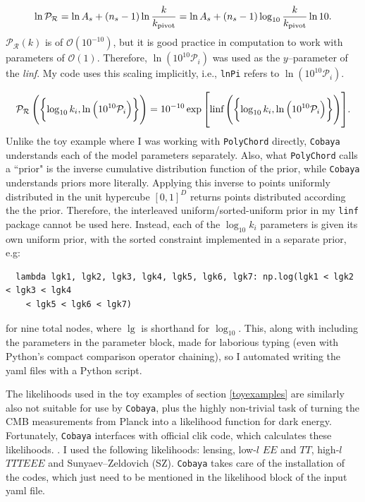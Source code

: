 \documentclass{article}
\begin{document}
\begin{equation}
  \ln{\mathcal P_\mathcal R} = \ln{A_s} + \left(n_s - 1\right) \ln{\frac{k}{k_\textrm{pivot}}} = \ln{A_s} + \left(n_s - 1\right) \log_{10}{\frac{k}{k_\textrm{pivot}}} \ln{10}\textrm.
\end{equation}
%
$\mathcal P_\mathcal R(k)$ is of $\mathcal{O}\left(10^{-10}\right)$, but it is good practice in computation to work with parameters of $\mathcal{O}\left(1\right)$. Therefore, $\ln{\left(10^{10}\mathcal P_i\right)}$  was used as the $y$--parameter of the \textit{linf}. My code uses this scaling implicitly, i.e., \texttt{lnPi} refers to $\ln{\left(10^{10}\mathcal P_i\right)}$.

\begin{equation}
  \mathcal P_\mathcal R\left(\left\{\log_{10}{k_i}, \ln{\left(10^{10}\mathcal P_i\right)}\right\}\right) = 10^{-10} \exp{\left[{\textrm{linf}\left(\left\{\log_{10}{k_i}, \ln{\left(10^{10}\mathcal P_i\right)}\right\}\right)}\right]}\textrm.
\end{equation}
%
Unlike the toy example where I was working with \texttt{PolyChord} directly, \texttt{Cobaya} understands each of the model parameters separately. Also, what \texttt{PolyChord} calls a ``prior" is the inverse cumulative distribution function of the prior, while \texttt{Cobaya} understands priors more literally. Applying this inverse to points uniformly distributed in the unit hypercube $[0, 1]^D$ returns points distributed according the the prior. Therefore, the interleaved uniform/sorted-uniform prior in my \texttt{linf} package cannot be used here. Instead, each of the $\log_{10}{k_i}$ parameters is given its own uniform prior, with the sorted constraint implemented in a separate prior, e.g:
\begin{verbatim}
  lambda lgk1, lgk2, lgk3, lgk4, lgk5, lgk6, lgk7: np.log(lgk1 < lgk2 < lgk3 < lgk4 
    < lgk5 < lgk6 < lgk7)
\end{verbatim}
for nine total nodes, where $\lg$ is shorthand for $\log_{10}$. This, along with including the parameters in the parameter block, made for laborious typing (even with Python's compact comparison operator chaining), so I automated writing the yaml files with a Python script.

The likelihoods used in the toy examples of section \ref{toyexamples} are similarly also not suitable for use by \texttt{Cobaya}, plus the highly non-trivial task of turning the CMB measurements from Planck into a likelihood function for dark energy. Fortunately, \texttt{Cobaya} interfaces with official clik code, which calculates these likelihoods. \cite{planck_likelihoods_1, planck_likelihoods_2}. I used the following likelihoods: lensing, low-$l$ $EE$ and $TT$, high-$l$ $TTTEEE$ and Sunyaev–Zeldovich (SZ). \texttt{Cobaya} takes care of the installation of the codes, which just need to be mentioned in the likelihood block of the input yaml file.
\end{document}
